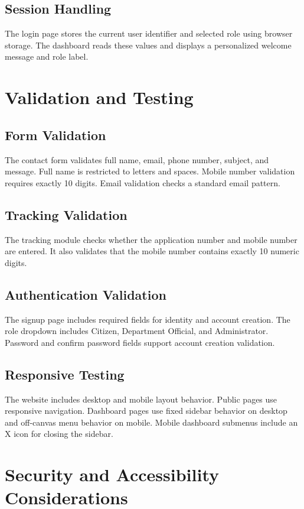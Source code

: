 \documentclass[12pt,a4paper]{report}
\begin{document}
\section{Session Handling}
The login page stores the current user identifier and selected role using browser storage. The dashboard reads these values and displays a personalized welcome message and role label.

\chapter{Validation and Testing}
\section{Form Validation}
The contact form validates full name, email, phone number, subject, and message. Full name is restricted to letters and spaces. Mobile number validation requires exactly 10 digits. Email validation checks a standard email pattern.

\section{Tracking Validation}
The tracking module checks whether the application number and mobile number are entered. It also validates that the mobile number contains exactly 10 numeric digits.

\section{Authentication Validation}
The signup page includes required fields for identity and account creation. The role dropdown includes Citizen, Department Official, and Administrator. Password and confirm password fields support account creation validation.

\section{Responsive Testing}
The website includes desktop and mobile layout behavior. Public pages use responsive navigation. Dashboard pages use fixed sidebar behavior on desktop and off-canvas menu behavior on mobile. Mobile dashboard submenus include an X icon for closing the sidebar.

\chapter{Security and Accessibility Considerations}
\end{document}
